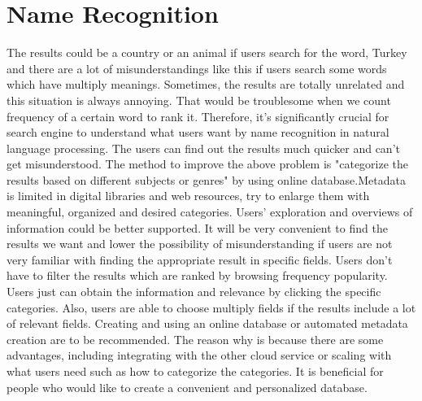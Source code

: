 \section*{Name Recognition}
The results could be a country or an animal if users search for the word, Turkey and there are a lot of misunderstandings like this if users search some words which have multiply meanings. Sometimes, the results are totally unrelated and this situation is always annoying. That would be troublesome when we count frequency of a certain word to rank it. 
Therefore, it's significantly crucial for search engine to understand what users want by name recognition in natural language processing. The users can find out the results much quicker and can't get misunderstood.
The method to improve the above problem is "categorize the results based on different subjects or genres" by using online database.Metadata is limited in digital libraries and web resources, try to enlarge them with meaningful, organized and desired categories.\cite{10.1145/1141753.1141801}
Users' exploration and overviews of information could be better supported. It will be very convenient to find the results we want and lower the possibility of misunderstanding if users are not very familiar with finding the appropriate result in specific fields.\cite{DBLP:journals/jis/NaT09} Users don't have to filter the results which are ranked by browsing frequency  popularity. Users just can obtain the information and relevance by clicking the specific categories. Also, users are able to choose multiply fields if the results include a lot of relevant fields. 
Creating and using an online database or automated metadata creation are to be recommended. The reason why is because there are some advantages, including integrating with the other cloud service or scaling with what users need such as how to categorize the categories. It is beneficial for people who would like to create a convenient and personalized database.    \\


